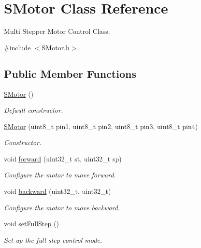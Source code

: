 \hypertarget{class_s_motor}{\section{S\+Motor Class Reference}
\label{class_s_motor}
}


Multi Stepper Motor Control Class.  




{\ttfamily \#include $<$S\+Motor.\+h$>$}

\subsection*{Public Member Functions}
\begin{DoxyCompactItemize}
\item 
\hyperlink{class_s_motor_a29d1d10288f83e41d200e3623541a351}{S\+Motor} ()
\begin{DoxyCompactList}\small\item\em Default constructor. \end{DoxyCompactList}\item 
\hyperlink{class_s_motor_a5a01eb70ccd1c4e82e0cabcd574a0aad}{S\+Motor} (uint8\+\_\+t pin1, uint8\+\_\+t pin2, uint8\+\_\+t pin3, uint8\+\_\+t pin4)
\begin{DoxyCompactList}\small\item\em Constructor. \end{DoxyCompactList}\item 
void \hyperlink{class_s_motor_ae266c2af254d76012b8132bb7641628d}{forward} (uint32\+\_\+t st, uint32\+\_\+t sp)
\begin{DoxyCompactList}\small\item\em Configure the motor to move forward. \end{DoxyCompactList}\item 
void \hyperlink{class_s_motor_a9d666d613dffcc324e0ae6e1e0a31a3f}{backward} (uint32\+\_\+t, uint32\+\_\+t)
\begin{DoxyCompactList}\small\item\em Configure the motor to move backward. \end{DoxyCompactList}\item 
void \hyperlink{class_s_motor_ab96b926a7df0a17fdc22946f9aa12fde}{set\+Full\+Step} ()
\begin{DoxyCompactList}\small\item\em Set up the full step control mode. \end{DoxyCompactList}\item 

\end{DoxyCompactItemize}
